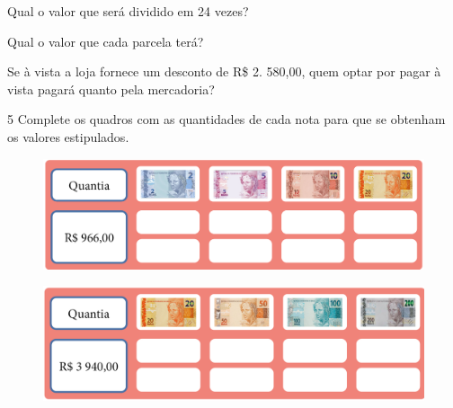\begin{escolha}
\item
  Qual o valor que será dividido em 24 vezes?\\


\item
  Qual o valor que cada parcela terá?\\


\item
  Se à vista a loja fornece um desconto de R\$ 2. 580,00, quem optar por
  pagar à vista pagará quanto pela mercadoria?\\

\end{escolha}


\pagebreak
\num{5} Complete os quadros com as quantidades de cada nota para que se obtenham os valores estipulados.

\begin{figure}[htpb!]
\includegraphics[width=\textwidth]{../ilustracoes/MAT5/SAEB_5ANO_MAT_figura51.png}
\end{figure}


\begin{figure}[htpb!]
\includegraphics[width=\textwidth]{../ilustracoes/MAT5/SAEB_5ANO_MAT_figura52.png}
\end{figure}

